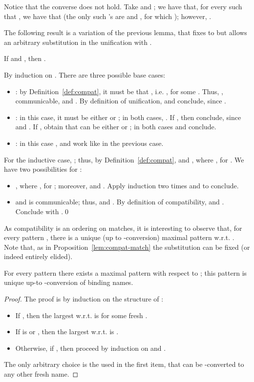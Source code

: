 \documentclass{LMCS}
\begin{document}
\noindent Notice that the converse does not hold. Take  and ; we have that, for every
 such that , we have that  (the only
such 's are  and , for which ); however, .

The following result is a variation of the previous lemma, that fixes  to  but
allows an arbitrary substitution in the unification with .

\begin{prop}
\label{lem:compat-match}
If  and ,
then .
\end{prop}
\proof
By induction on . There are three possible base cases:
\begin{itemize}
\item : by Definition~\ref{def:compat}, it must be that , i.e.
, for some . Thus, ,
 communicable,  and .
By definition of unification,  and conclude, since
.

\item : in this case, it must be either  or ; in both cases, .
If , then conclude, since  and .
If , obtain that  can be either  or ; in both cases 
and conclude.

\item : in this case ,  and work like in the previous case.
\end{itemize}
For the inductive case, ; thus, by Definition~\ref{def:compat},
 and , where
, for . We have two possibilities for :
\begin{itemize}
\item , where , for ; 
moreover, 
and . Apply induction two times and to conclude.

\item  and  is communicable; thus,  and .
  By definition of compatibility,  and . Conclude
  with .\qed
\end{itemize}


\noindent As compatibility is an ordering on matches,
it is interesting to observe that, for every pattern , there is a unique (up to -conversion) 
maximal pattern w.r.t. . Note that, as in Proposition~\ref{lem:compat-match} the substitution can be 
fixed (or indeed entirely elided).

\begin{prop}
\label{prop:maximal}
For every pattern  there exists a maximal pattern  with respect to ;
this pattern is unique up-to -conversion of binding names.
\end{prop}
\begin{proof}
The proof is by induction on the structure of :
\begin{itemize}
	\item If , then the largest  w.r.t.  is  for some fresh .
	\item If  is  or , then the largest  w.r.t.  is .
	\item Otherwise, if , then proceed by induction on  and .
\end{itemize}
The only arbitrary choice is the  used in the first item, that can be -converted to
any other fresh name.
\end{proof}
\end{document}
